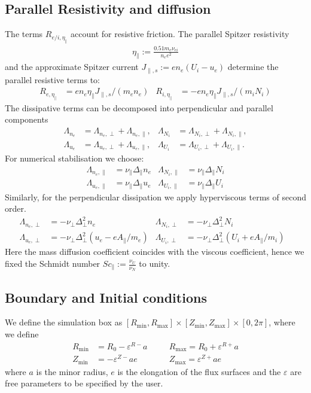 \subsection{Parallel Resistivity and diffusion}\label{sec:dissres}
The terms $R_{e/i,\eta_\parallel}$ account for resistive friction.
The parallel Spitzer resistivity
\begin{align}
\eta_\parallel := \frac{0.51 m_e \nu_{ei}}{n_e e^2}
\end{align}
and the approximate Spitzer current \(J_{\parallel,s}:= e n_e \left(U_i - u_e\right)\) determine the parallel resistive terms to:
\begin{align}
  R_{e,\eta_\parallel} &=  en_e\eta_\parallel J_{\parallel,s}/(m_en_e)  &
  R_{i,\eta_\parallel} &=- en_e\eta_\parallel J_{\parallel,s}/(m_iN_i)
\end{align}
The dissipative terms can be decomposed into perpendicular and parallel components
\begin{align}
 \Lambda_{n_e} &= \Lambda_{n_e,\perp}+\Lambda_{n_e,\parallel}, &
 \Lambda_{N_i} &= \Lambda_{N_i,\perp}+\Lambda_{N_i,\parallel},\\
 \Lambda_{u_e} &= \Lambda_{u_e,\perp}+\Lambda_{u_e,\parallel},&
 \Lambda_{U_i} &= \Lambda_{U_i,\perp}+\Lambda_{U_i,\parallel}.
\end{align}
For numerical stabilisation we choose:
\begin{align}
\Lambda_{n_e,\parallel} &= \nu_\parallel \Delta_\parallel n_e &
\Lambda_{N_i,\parallel} &= \nu_\parallel \Delta_\parallel N_i \\
\Lambda_{u_e,\parallel} &= \nu_\parallel \Delta_\parallel u_e &
\Lambda_{U_i,\parallel} &= \nu_\parallel \Delta_\parallel U_i 
\end{align}
Similarly, for the perpendicular dissipation we apply hyperviscous terms of second order.
\begin{align}\label{eq:perpdiffNT}
 \Lambda_{n_e,\perp} &=  -\nu_\perp \Delta_\perp^2 n_e &
 \Lambda_{N_i,\perp} &=  -\nu_\perp \Delta_\perp^2 N_i  & \\
 \Lambda_{u_e,\perp} &=  -\nu_\perp \Delta_\perp^2 (u_e - eA_\parallel/m_e)  &
 \Lambda_{U_i,\perp} &=  -\nu_\perp \Delta_\perp^2 (U_i + eA_\parallel/m_i)
\end{align}
Here the mass diffusion coefficient coincides with the viscous coefficient, hence we fixed the Schmidt number \(\mathit{Sc}_\parallel:= \frac{\nu_U}{\nu_N}\) to unity.

\subsection{Boundary and Initial conditions}
We define the simulation box as
$[ R_{\min}, R_{\max}]\times [Z_{\min}, Z_{\max}] \times [0,2\pi]$,
where we define
\begin{align} \label{eq:box}
    R_{\min}&=R_0-\varepsilon^{R-}a\quad
    &&R_{\max}=R_0+\varepsilon^{R+}a\nonumber\\
    Z_{\min}&=-\varepsilon^{Z-}ae\quad
    &&Z_{\max}=\varepsilon^{Z+}ae
\end{align}
where $a$ is the minor radius, $e$ is the elongation of the flux surfaces and
the $\varepsilon$ are free parameters to be specified by the user.


